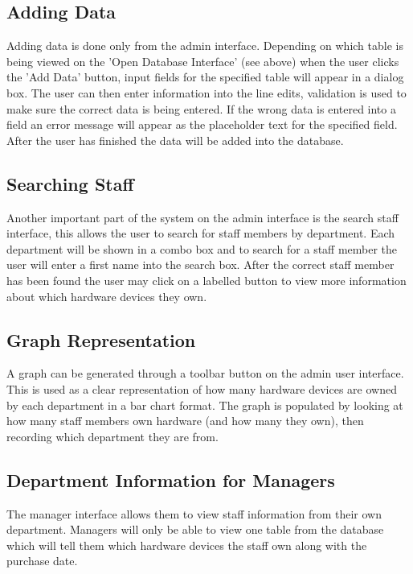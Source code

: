 \subsection{Adding Data}

Adding data is done only from the admin interface. Depending on which table is being viewed on the 'Open Database Interface' (see above) when the user clicks the 'Add Data' button, input fields for the specified table will appear in a dialog box. The user can then enter information into the line edits, validation is used to make sure the correct data is being entered. If the wrong data is entered into a field an error message will appear as the placeholder text for the specified field. After the user has finished the data will be added into the database.

\subsection{Searching Staff}

Another important part of the system on the admin interface is the search staff interface, this allows the user to search for staff members by department. Each department will be shown in a combo box and to search for a staff member the user will enter a first name into the search box. After the correct staff member has been found the user may click on a labelled button to view more information about which hardware devices they own.

\subsection{Graph Representation}

A graph can be generated through a toolbar button on the admin user interface. This is used as a clear representation of how many hardware devices are owned by each department in a bar chart format. The graph is populated by looking at how many staff members own hardware (and how many they own), then recording which department they are from.

\subsection{Department Information for Managers}

The manager interface allows them to view staff information from their own department. Managers will only be able to view one table from the database which will tell them which hardware devices the staff own along with the purchase date. 

